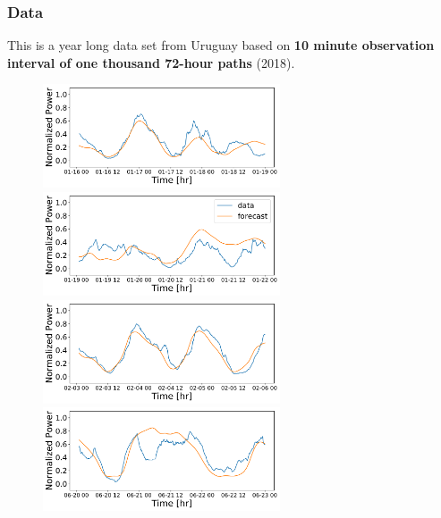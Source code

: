 \documentclass[aspectratio=169]{beamer}\usepackage[utf8]{inputenc}
\begin{document}
\begin{frame}\frametitle{Data}
This is a year long data set from Uruguay based on \textbf{10 minute observation interval of one thousand 72-hour paths} (2018).
\begin{figure}
  \includegraphics[width=70mm,scale=1]{plots/data_1516064400.pdf}
  \includegraphics[width=70mm,scale=1]{plots/data_1516323600.pdf}\\
  \includegraphics[width=70mm,scale=1]{plots/data_1517619600.pdf}
  \includegraphics[width=70mm,scale=1]{plots/data_1529456400.pdf}
\end{figure}
\end{frame}
\end{document}

